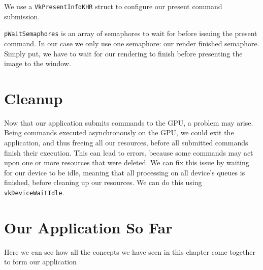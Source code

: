 We use a \texttt{VkPresentInfoKHR} struct to configure our present command submission.

\texttt{pWaitSemaphores} is an array of semaphores to wait for before issuing the present
command.
In our case we only use one semaphore: our render finished semaphore.
Simply put, we have to wait for our rendering to finish before presenting
the image to the window.

\begin{minipage}{\linewidth}{\noindent}
    
\end{minipage}

\section{Cleanup}

Now that our application submits commands to the GPU, a problem may arise.
Being commands executed asynchronously on the GPU, we could exit the application,
and thus freeing all our resources, before all submitted commands finish
their execution.
This can lead to errors, because some commands may act upon one or more resources
that were deleted.
We can fix this issue by waiting for our device to be idle, meaning that
all processing on all device's queues is finished, before cleaning up our resources.
We can do this using \texttt{vkDeviceWaitIdle}.

\section{Our Application So Far}

Here we can see how all the concepts we have seen in this chapter come together
to form our application

\begin{minipage}{\linewidth}{\noindent}
    
\end{minipage}
